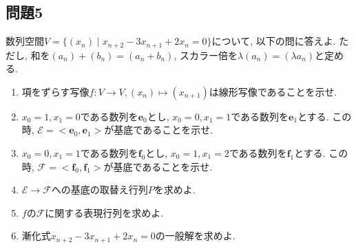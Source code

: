 \documentclass[a4j,dvipdfmx]{jsarticle}
\newcommand{\E}{\mathcal{E}}
\newcommand{\F}{\mathcal{F}}
\begin{document}
    \subsection*{問題5}
        数列空間$V=\{(x_n)\mid x_{n+2}-3x_{n+1}+2x_{n}=0\}$について, 以下の問に答えよ. ただし, 和を$(a_n)+(b_n)=(a_n+b_n)$, スカラー倍を$\lambda (a_n)=(\lambda a_n)$と定める.
        \begin{enumerate}
            \item 項をずらす写像$f:V\to V,(x_{n})\mapsto (x_{n+1})$は線形写像であることを示せ.
            \item $x_0=1,x_1=0$である数列を$\bm{e}_0$とし, $x_0=0,x_1=1$である数列を$\bm{e}_1$とする. この時, $\E=<\bm{e}_0,\bm{e}_1>$が基底であることを示せ.
            \item $x_0=0,x_1=1$である数列を$\bm{f}_0$とし, $x_0=1,x_1=2$である数列を$\bm{f}_1$とする. この時, $\F=<\bm{f}_0,\bm{f}_1>$が基底であることを示せ.
            \item $\E\to\F$への基底の取替え行列$P$を求めよ.
            \item $f$の$\F$に関する表現行列を求めよ.
            \item 漸化式$x_{n+2}-3x_{n+1}+2x_{n}=0$の一般解を求めよ.
        \end{enumerate}
\end{document}
